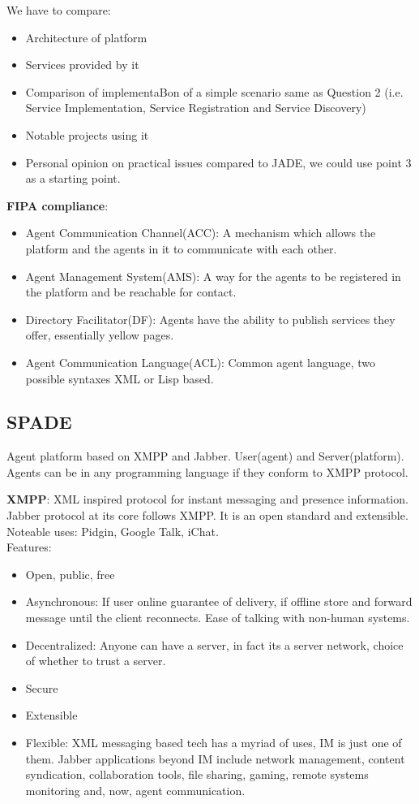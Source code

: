 \documentclass[a4paper, 11pt]{article}
\begin{document}
We have to compare:
\begin{itemize}
	\item Architecture of platform
	\item Services provided by it
	\item Comparison of implementaBon of a simple scenario	same as	Question 2 (i.e.	Service Implementation,	Service	Registration and Service Discovery)
	\item Notable projects using it
	\item Personal opinion on practical issues compared to JADE, we could use point 3 as a starting point.
\end{itemize}

\textbf{FIPA compliance}: 
\begin{itemize}
	\item Agent Communication Channel(ACC): A mechanism which allows the platform and the agents in it to communicate with each other.
	\item Agent Management System(AMS): A way for the agents to be registered in the platform and be reachable for contact.
	\item Directory Facilitator(DF): Agents have the ability to publish services they offer, essentially yellow pages.
	\item Agent Communication Language(ACL): Common agent language, two possible syntaxes XML or Lisp based.
\end{itemize}

\subsection{SPADE}

Agent platform based on XMPP and Jabber. User(agent) and Server(platform). Agents can be in any programming language if they conform to XMPP protocol.

\textbf{XMPP}: XML inspired protocol for instant messaging and presence information. Jabber protocol at its core follows XMPP. It is an open standard and extensible. Noteable uses: Pidgin, Google Talk, iChat. \\
Features: \\
\begin{itemize}
	\item Open, public, free
	\item Asynchronous: If user online guarantee of delivery, if offline store and forward message until the client reconnects. Ease of talking with non-human systems.
	\item Decentralized: Anyone can have a server, in fact its a server network, choice of whether to trust a server.
	\item Secure
	\item Extensible
	\item Flexible: XML messaging based tech has a myriad of uses, IM is just one of them. Jabber applications beyond IM include network management, content syndication, collaboration tools, file sharing, gaming, remote systems monitoring and, now, agent communication.
\end{itemize}
\end{document}
